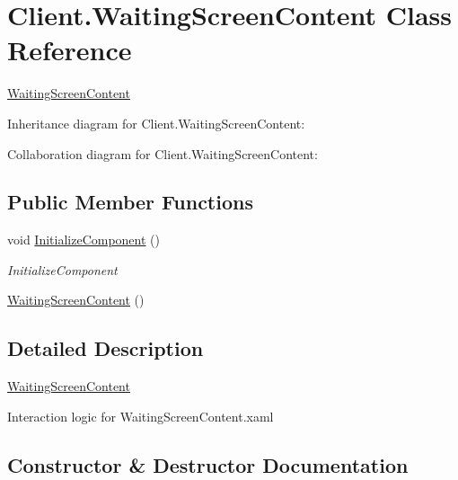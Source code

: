 \hypertarget{class_client_1_1_waiting_screen_content}{}\section{Client.\+Waiting\+Screen\+Content Class Reference}
\label{class_client_1_1_waiting_screen_content}


\hyperlink{class_client_1_1_waiting_screen_content}{Waiting\+Screen\+Content}  




Inheritance diagram for Client.\+Waiting\+Screen\+Content\+:


Collaboration diagram for Client.\+Waiting\+Screen\+Content\+:
\subsection*{Public Member Functions}
\begin{DoxyCompactItemize}
\item 
void \hyperlink{class_client_1_1_waiting_screen_content_ae0f844e30146525367bff1716bbeabe6}{Initialize\+Component} ()
\begin{DoxyCompactList}\small\item\em Initialize\+Component \end{DoxyCompactList}\item 
\hyperlink{class_client_1_1_waiting_screen_content_ae4f1a56818ffc0dcf3fa0ff69cb1f13a}{Waiting\+Screen\+Content} ()
\end{DoxyCompactItemize}


\subsection{Detailed Description}
\hyperlink{class_client_1_1_waiting_screen_content}{Waiting\+Screen\+Content} 

Interaction logic for Waiting\+Screen\+Content.\+xaml 

\subsection{Constructor \& Destructor Documentation}
\mbox{\label{class_client_1_1_waiting_screen_content_ae4f1a56818ffc0dcf3fa0ff69cb1f13a}} 
